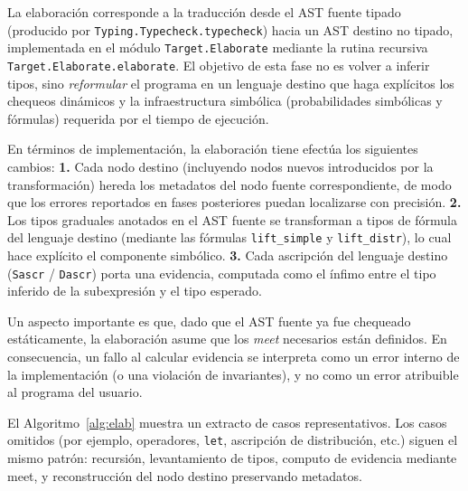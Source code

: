 La elaboración corresponde a la traducción desde el AST fuente
tipado (producido por \verb|Typing.Typecheck.typecheck|) hacia
un AST destino no tipado, implementada en el módulo
\verb|Target.Elaborate| mediante la rutina recursiva
\verb|Target.Elaborate.elaborate|. El objetivo de esta fase no es
volver a inferir tipos, sino \emph{reformular} el programa en un
lenguaje destino que haga explícitos los chequeos dinámicos y la
infraestructura simbólica (probabilidades simbólicas y fórmulas)
requerida por el tiempo de ejecución.

En términos de implementación, la elaboración tiene efectúa los
siguientes cambios: \textbf{1.} Cada nodo destino (incluyendo nodos
nuevos introducidos por la transformación) hereda los metadatos del
nodo fuente correspondiente, de modo que los errores reportados en
fases posteriores puedan localizarse con precisión.  \textbf{2.} Los
tipos graduales anotados en el AST fuente se transforman a tipos de
fórmula del lenguaje destino (mediante las fórmulas
\lstinline|lift_simple| y \lstinline|lift_distr|), lo cual hace
explícito el componente simbólico.  \textbf{3.} Cada ascripción del
lenguaje destino (\lstinline|Sascr| / \lstinline|Dascr|) porta una
evidencia, computada como el ínfimo entre el tipo inferido de la
subexpresión y el tipo esperado.

Un aspecto importante es que, dado que el AST fuente ya fue chequeado
estáticamente, la elaboración asume que los \emph{meet} necesarios
están definidos. En consecuencia, un fallo al calcular evidencia se
interpreta como un error interno de la implementación (o una violación
de invariantes), y no como un error atribuible al programa del
usuario.

El Algoritmo~\ref{alg:elab} muestra un extracto de casos
representativos.  Los casos omitidos (por ejemplo, operadores,
\lstinline|let|, ascripción de distribución, etc.)  siguen el mismo
patrón: recursión, levantamiento de tipos, computo de evidencia
mediante {meet}, y reconstrucción del nodo destino preservando
metadatos.


